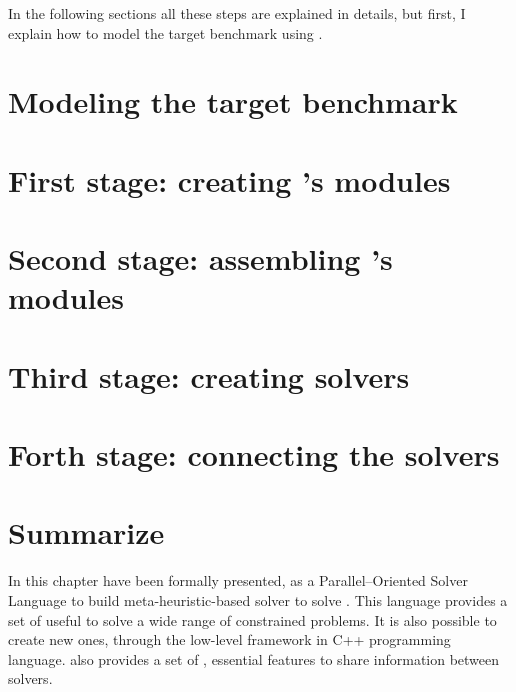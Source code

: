 
In the following sections all these steps are explained in details, but first, I explain how to model the target benchmark using \posl.

\section{Modeling the target benchmark}
\label{sec:model}



\section{First stage: creating \posl's modules}
\label{sec:1ststage}



\section{Second stage: assembling \posl's modules}
\label{sec:2ndstage}



\section{Third stage: creating \posl{} solvers}
\label{sec:3rdstage}



\section{Forth stage: connecting the solvers}
\label{sec:4thstage}



\section{Summarize}
\label{sec:posl_zum}

In this chapter \posl{} have been formally presented, as a Parallel--Oriented Solver Language to build meta-heuristic-based solver to solve \CSPs{}. This language provides a set of \oms{} useful to solve a wide range of constrained problems. It is also possible to create new ones, through the low-level framework in C++ programming language. \posl{} also provides a set of \opchs{}, essential features to share information between solvers.

